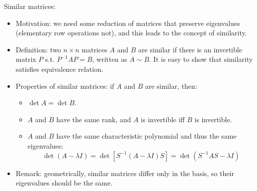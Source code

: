 \documentclass{report}
\begin{document}
Similar matrices:
\begin{itemize}
	\item Motivation: we need some reduction of matrices that preserve eigenvalues (elementary row operations not), and this leads to the concept of similarity. 
	
	\item Definition: two $n \times n$ matrices $A$ and $B$ are similar if there is an invertible matrix $P$ s.t. $P^{-1} A P = B$, written as $A \sim B$. It is easy to show that similarity satisfies equivalence relation.  
	
	\item Properties of similar matrices: if $A$ and $B$ are similar, then:
	\begin{itemize}
		\item $\det A = \det B$.  
		\item $A$ and $B$ have the same rank, and $A$ is invertible iff $B$ is invertible.
		\item $A$ and $B$ have the same characteristic polynomial and thus the same eigenvalues: 
		\begin{equation}
		\det (A - \lambda I) = \det [S^{-1} (A - \lambda I) S] = \det (S^{-1} A S - \lambda I)	
		\end{equation}
	\end{itemize}
	
	\item Remark: geometrically, similar matrices differ only in the basis, so their eigenvalues should be the same. 
\end{itemize}
\end{document}
